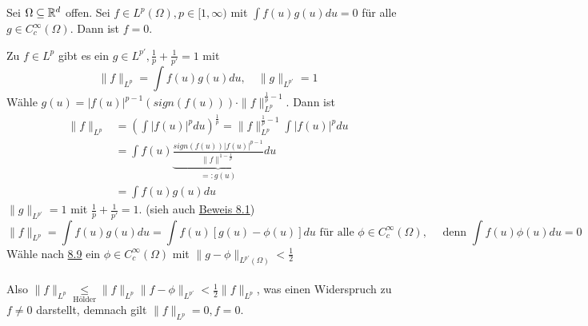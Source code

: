 \begin{kor} \label{kor:8.10}
	Sei $\Omega \subseteq \mathbb{R}^{d}$ offen. Sei $f \in L^{p}(\Omega), p \in [1, \infty)$ mit $\int f(u) g(u) du = 0$ für alle $g \in C_{c}^{\infty}(\Omega)$. Dann ist $f = 0$.
	\begin{beweis}
		Zu $f \in L^{p}$ gibt es ein $g \in L^{p'}, \frac{1}{p} + \frac{1}{p'} = 1$ mit 
		\[ \| f \|_{L^{p}} = \int f(u) g(u) du, \quad \| g \|_{L^{p'}} = 1 \]
		Wähle $g(u) = |f(u)|^{p - 1} \left( sign(f(u)) \right) \cdot \| f \|_{L^{p}}^{\frac{1}{p} - 1}$. Dann ist
		\begin{align*}
			\| f \|_{L^{p}} & = \left( \int |f(u)|^{p} du \right)^{\frac{1}{p}} = \| f \|_{L^{p}}^{\frac{1}{p} - 1} \int |f(u)|^{p} du \\
			& = \int f(u) \underbrace{\frac{sign(f(u)) |f(u)|^{p - 1}}{\| f \|^{1 - \frac{1}{p}}}}_{=: g(u)} du \\
			& = \int f(u) g(u) du
		\end{align*}
		$\| g \|_{L^{p'}} = 1$ mit $\frac{1}{p} + \frac{1}{p'} = 1$. (sieh auch \hyperref[satz:8.1]{Beweis 8.1}) 
		\[ \| f \|_{L^{p}} = \int f(u) g(u) du = \int f(u) [g(u) - \phi(u)] du \text{ für alle } \phi \in C_{c}^{\infty}(\Omega), \quad \text{ denn } \int f(u) \phi(u) du = 0 \]
		Wähle nach \hyperref[kor:8.9]{8.9} ein $\phi \in C_{c}^{\infty}(\Omega)$ mit $\| g - \phi \|_{L^{p'}(\Omega)} < \frac{1}{2}$ \\ \\
		Also $\| f \|_{L^{p}} \underset{\text{Hölder}}{\leq} \| f \|_{L^{p}} \| f - \phi \|_{L^{p'}} < \frac{1}{2} \| f \|_{L^{p}}$, was einen Widerspruch zu $f \neq 0$ darstellt, demnach gilt $\| f \|_{L^{p}} = 0, f = 0$.
	\end{beweis}

\end{kor}


\newpage






























	